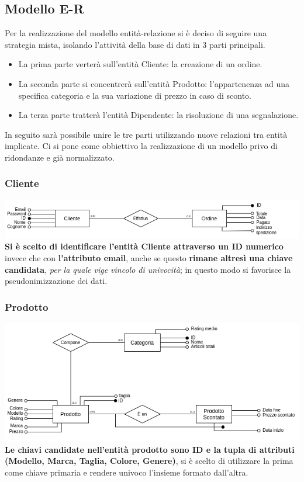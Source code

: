 \subsection{Modello E-R}
Per la realizzazione del modello entità-relazione si è deciso di seguire una strategia mista, isolando l'attività della base di dati in 3 parti principali. 
\begin{itemize}
    \item La prima parte verterà sull'entità Cliente: la creazione di un ordine.
    
    \item La seconda parte si concentrerà sull'entità Prodotto: l'appartenenza ad una specifica categoria e la sua variazione di prezzo in caso di sconto.
    
    \item La terza parte tratterà l'entità Dipendente: la risoluzione di una segnalazione.
\end{itemize}In seguito sarà possibile unire le tre parti utilizzando nuove relazioni tra entità implicate. Ci si pone come obbiettivo la realizzazione di un modello privo di ridondanze e già normalizzato. 

\subsubsection{Cliente}
\includegraphics[scale=0.65]{images/cliente.png}
\textbf{Si è scelto di identificare l'entità Cliente attraverso un ID numerico} invece che con\textbf{ l'attributo email}, anche se questo \textbf{rimane altresì una chiave candidata}, \textit{per la quale vige vincolo di univocità}; in questo modo si favorisce la pseudonimizzazione dei dati.

\subsubsection{Prodotto}
\includegraphics[scale=0.65]{images/prodotto.png}
\textbf{Le chiavi candidate nell'entità prodotto sono ID e la tupla di attributi (Modello, Marca, Taglia, Colore, Genere)}, si è scelto di utilizzare la prima come chiave primaria e rendere univoco l'insieme formato dall'altra.
